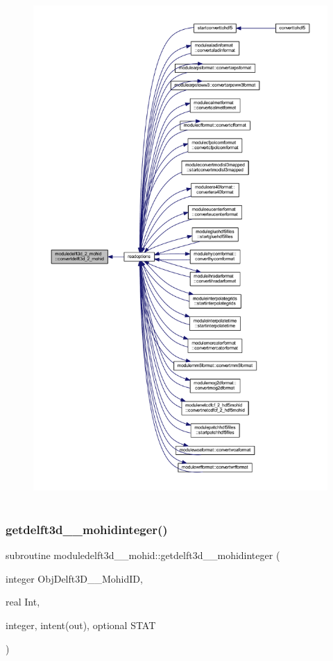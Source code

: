 \begin{figure}[H]
\begin{center}
\leavevmode
\includegraphics[height=550pt]{namespacemoduledelft3d__2__mohid_a03b75d6d9aec2bf65fd05cc9aaec61ab_icgraph}
\end{center}
\end{figure}
\mbox{\label{namespacemoduledelft3d__2__mohid_a5500fdcc30972ef82a49b8924a5a44fe}} 
\subsubsection{\texorpdfstring{getdelft3d\+\_\+\_\+mohidinteger()}{getdelft3d\_2\_mohidinteger()}}
{\footnotesize\ttfamily subroutine moduledelft3d\+\_\+\_\+mohid\+::getdelft3d\+\_\+\_\+mohidinteger (\begin{DoxyParamCaption}\item[{integer}]{Obj\+Delft3\+D\+\_\+\_\+\+Mohid\+ID,  }\item[{real}]{Int,  }\item[{integer, intent(out), optional}]{S\+T\+AT }\end{DoxyParamCaption})\hspace{0.3cm}{\ttfamily [private]}}

